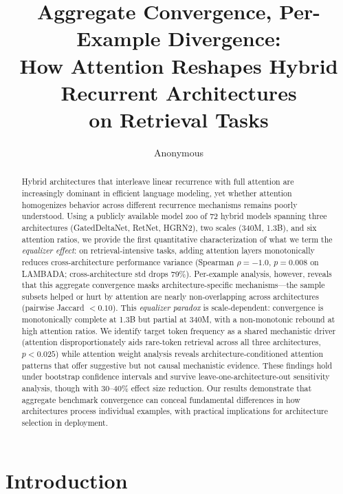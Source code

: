 \documentclass[11pt,a4paper]{article}
\title{Aggregate Convergence, Per-Example Divergence:\\ How Attention Reshapes Hybrid Recurrent Architectures\\ on Retrieval Tasks}
\author{Anonymous}
\date{}
\begin{document}
\maketitle

\begin{abstract}
Hybrid architectures that interleave linear recurrence with full attention are increasingly dominant in efficient language modeling, yet whether attention homogenizes behavior across different recurrence mechanisms remains poorly understood. Using a publicly available model zoo of 72 hybrid models spanning three architectures (GatedDeltaNet, RetNet, HGRN2), two scales (340M, 1.3B), and six attention ratios, we provide the first quantitative characterization of what we term the \emph{equalizer effect}: on retrieval-intensive tasks, adding attention layers monotonically reduces cross-architecture performance variance (Spearman $\rho{=}{-}1.0$, $p{=}0.008$ on LAMBADA; cross-architecture std drops 79\%). Per-example analysis, however, reveals that this aggregate convergence masks architecture-specific mechanisms---the sample subsets helped or hurt by attention are nearly non-overlapping across architectures (pairwise Jaccard $< 0.10$). This \emph{equalizer paradox} is scale-dependent: convergence is monotonically complete at 1.3B but partial at 340M, with a non-monotonic rebound at high attention ratios. We identify target token frequency as a shared mechanistic driver (attention disproportionately aids rare-token retrieval across all three architectures, $p < 0.025$) while attention weight analysis reveals architecture-conditioned attention patterns that offer suggestive but not causal mechanistic evidence. These findings hold under bootstrap confidence intervals and survive leave-one-architecture-out sensitivity analysis, though with 30--40\% effect size reduction. Our results demonstrate that aggregate benchmark convergence can conceal fundamental differences in how architectures process individual examples, with practical implications for architecture selection in deployment.
\end{abstract}

\section{Introduction}
\end{document}
